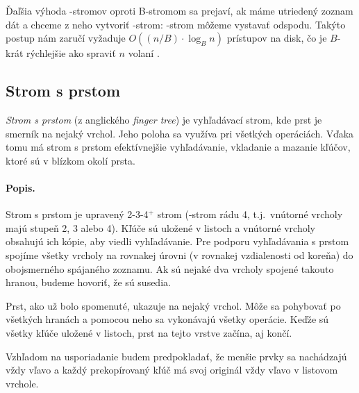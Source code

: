 Ďaľšia výhoda \Bp-stromov oproti B-stromom sa prejaví, ak máme utriedený zoznam dát a chceme z neho vytvoriť \Bp-strom:
\Bp-strom môžeme vystavať odspodu. Takýto postup nám zaručí vyžaduje $O((n/B)\cdot\log_B n)$ prístupov na disk,
čo je $B$-krát rýchlejšie ako spraviť $n$ volaní \ins.




\subsection{Strom s prstom}
\emph{Strom s prstom} (z anglického \emph{finger tree}) je vyhľadávací strom, kde prst je smerník na nejaký
vrchol. Jeho poloha sa využíva pri všetkých operáciách. Vďaka tomu má strom s prstom efektívnejšie vyhľadávanie,
vkladanie a mazanie kľúčov, ktoré sú v blízkom okolí prsta.

\paragraph{Popis.}
Strom s prstom je upravený 2-3-4$^+$ strom (\Bp-strom rádu 4, t.j.\ vnútorné vrcholy
majú stupeň 2, 3 alebo 4). Kľúče sú uložené v listoch a vnútorné vrcholy
obsahujú ich kópie, aby viedli vyhľadávanie. Pre podporu vyhľadávania
s prstom spojíme všetky vrcholy na rovnakej úrovni (v rovnakej vzdialenosti od koreňa)
do obojsmerného spájaného zoznamu.
Ak sú nejaké dva vrcholy spojené takouto hranou, budeme hovoriť, že sú susedia.

Prst, ako už bolo spomenuté, ukazuje na nejaký vrchol. Môže sa pohybovať po všetkých hranách
a pomocou neho sa vykonávajú všetky operácie. Keďže sú všetky kľúče uložené v listoch, prst
na tejto vrstve začína, aj končí.

Vzhľadom na usporiadanie budem predpokladať, že menšie prvky sa nachádzajú vždy vľavo a každý
prekopírovaný kľúč má svoj originál vždy vľavo v listovom vrchole.


